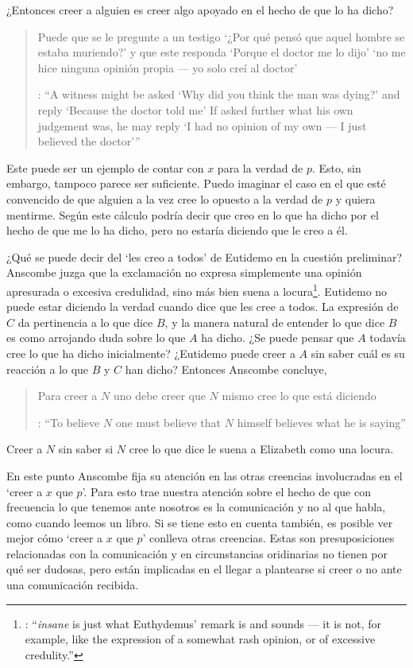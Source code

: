 ¿Entonces creer a alguien es creer algo apoyado en el hecho de que lo ha dicho? \blockquote[{\cite[4]{anscombe2008faith:tobelieve}}: \enquote{A witness might be asked `Why did you think the man was dying?' and reply `Because the doctor told me' \textelp{} If asked further what his own judgement was, he may reply `I had no opinion of my own --- I just believed the doctor'}]{Puede que se le pregunte a un testigo `¿Por qué pensó que aquel hombre se estaba muriendo?' y que este responda `Porque el doctor me lo dijo' \textelp{} `no me hice ninguna opinión propia --- yo solo creí al doctor'}. Este puede ser un ejemplo de contar con $x$ para la verdad de $p$. Esto, sin embargo, tampoco parece ser suficiente. Puedo imaginar el caso en el que esté convencido de que alguien a la vez cree lo opuesto a la verdad de $p$ y quiera mentirme. Según este cálculo podría decir que creo en lo que ha dicho por el hecho de que me lo ha dicho, pero no estaría diciendo que le creo a él.

¿Qué se puede decir del \enquote*{les creo a todos} de Eutidemo en la cuestión preliminar? Anscombe juzga que la exclamación no expresa simplemente una opinión apresurada o excesiva credulidad, sino más bien suena a locura\footnote{\cite[Cf.~][5]{anscombe2008faith:tobelieve}: \enquote{\emph{insane} is just what Euthydemus' remark is and sounds --- it is not, for example, like the expression of a somewhat rash opinion, or of excessive credulity.}}. Eutidemo no puede estar diciendo la verdad cuando dice que les cree a todos. La expresión de $C$ da pertinencia a lo que dice $B$, y la manera natural de entender lo que dice $B$ es como arrojando duda sobre lo que $A$ ha dicho. ¿Se puede pensar que $A$ todavía cree lo que ha dicho inicialmente? ¿Eutidemo puede creer a $A$ sin saber cuál es su reacción a lo que $B$ y $C$ han dicho? Entonces Anscombe concluye, \blockquote[{\cite[5]{anscombe2008faith:tobelieve}}: \enquote{To believe $N$ one must believe that $N$ himself believes what he is saying}]{Para creer a $N$ uno debe creer que $N$ mismo cree lo que está diciendo}. Creer a $N$ sin saber si $N$ cree lo que dice le suena a Elizabeth como una locura.

En este punto Anscombe fija su atención en las otras creencias involucradas en el `creer a $x$ que $p$'. Para esto trae nuestra atención sobre el hecho de que con frecuencia lo que tenemos ante nosotros es la comunicación y no al que habla, como cuando leemos un libro. Si se tiene esto en cuenta también, es posible ver mejor cómo `creer a $x$ que $p$' conlleva otras creencias. Estas son presuposiciones relacionadas con la comunicación y en circunstancias oridinarias no tienen por qué ser dudosas, pero están implicadas en el llegar a plantearse si creer o no ante una comunicación recibida.

